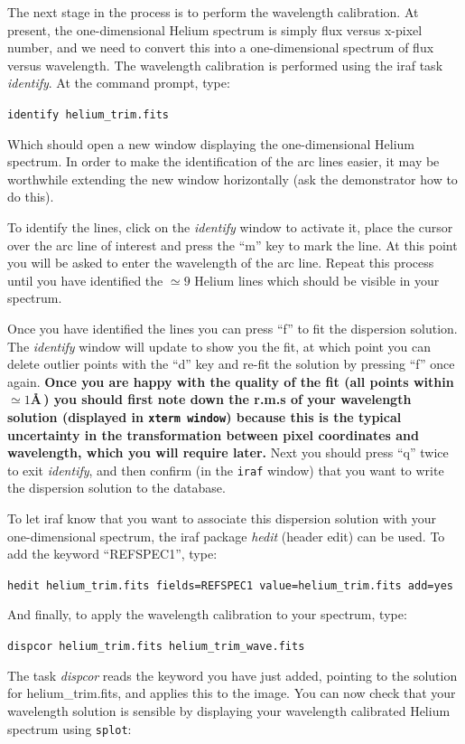 \documentclass[12pt]{article}
\begin{document}
The next stage in the process is to perform the wavelength
calibration. At present, the one-dimensional Helium spectrum is 
simply flux versus x-pixel number, and we need to convert this into a 
one-dimensional spectrum of flux versus wavelength. The wavelength
calibration is performed using the {\sc iraf} task {\it identify}. 
At the command prompt, type:

{\tt identify helium\verb,_trim,.fits}

Which should open a new window displaying the one-dimensional Helium
spectrum. In order to make the identification of the arc lines easier, it
may be worthwhile extending the new window horizontally (ask the
demonstrator how to do this).



To identify the lines, click on the {\it identify} window to activate
it, place the cursor over the arc line of interest and press the ``m''
key to mark the line. At this point you will be asked to enter the
wavelength of the arc line. Repeat this process
until you have identified the $\simeq 9$ Helium lines which should be
visible in your spectrum. 

\noindent
Once you have
identified the lines you can press ``f'' to fit the dispersion
solution. The {\it identify} window will update to show you the fit,
at which point you can delete outlier points with the ``d'' key and
re-fit the solution by pressing ``f'' once again. {\bf Once you are happy
with the quality of the fit (all points within $\simeq1$\AA\,) you
should first note down the r.m.s of your wavelength solution (displayed in
{\tt xterm window}) because this is the typical uncertainty in the 
transformation between pixel coordinates and wavelength, which you will require later.}
Next you should press ``q'' twice to exit {\it identify}, and then
confirm (in the {\tt iraf} window) that you want to write the dispersion solution to the database. 

To let {\sc iraf} know that you want to associate this dispersion
solution with your one-dimensional spectrum, the {\sc iraf} package {\it hedit} (header edit) can be used. To add
the keyword ``REFSPEC1'', type:

{\tt hedit helium\verb,_trim,.fits fields=REFSPEC1 value=helium\verb,_trim,.fits add=yes}

And finally, to apply the wavelength calibration to your spectrum, type:

{\tt dispcor helium\verb,_trim.fits helium_trim_wave.fits,}

The task {\it dispcor} reads the keyword you have just added, pointing to the solution for {\sc helium_trim.fits}, and
applies this to the image.
You can now check that your wavelength solution is sensible by
displaying your wavelength calibrated Helium spectrum using {\tt splot}:
\end{document}
